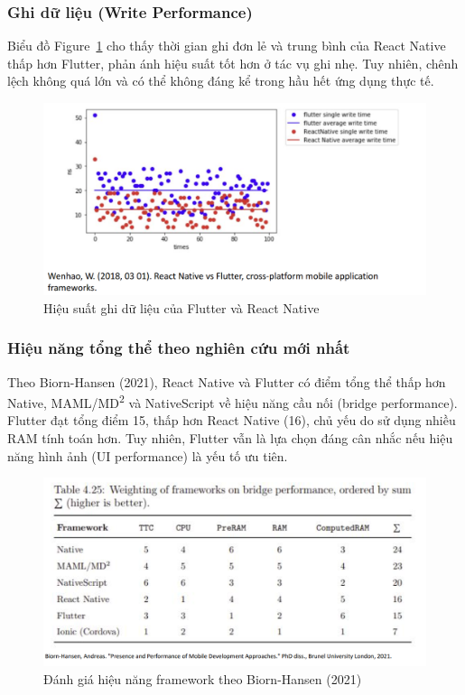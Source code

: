 \subsubsection{Ghi dữ liệu (Write Performance)}

  Biểu đồ Figure~\ref{fig:write} cho thấy thời gian ghi đơn lẻ và trung bình của React Native thấp hơn Flutter, phản ánh hiệu suất tốt hơn ở tác vụ ghi nhẹ. Tuy nhiên, chênh lệch không quá lớn và có thể không đáng kể trong hầu hết ứng dụng thực tế.

\begin{figure}[H]
    \centering
    \includegraphics[width=0.8\linewidth]{images/read_write.png}
    \caption{Hiệu suất ghi dữ liệu của Flutter và React Native \cite{maulana2023}}
    \label{fig:write}
\end{figure}

\subsubsection{Hiệu năng tổng thể theo nghiên cứu mới nhất}

  Theo Biorn-Hansen (2021), React Native và Flutter có điểm tổng thể thấp hơn Native, MAML/MD\textsuperscript{2} và NativeScript về hiệu năng cầu nối (bridge performance). Flutter đạt tổng điểm 15, thấp hơn React Native (16), chủ yếu do sử dụng nhiều RAM tính toán hơn. Tuy nhiên, Flutter vẫn là lựa chọn đáng cân nhắc nếu hiệu năng hình ảnh (UI performance) là yếu tố ưu tiên.

\begin{figure}[H]
    \centering
    \includegraphics[width=0.7\linewidth]{images/performance.png}
    \caption{Đánh giá hiệu năng framework theo Biorn-Hansen (2021)}
    \label{fig:overall}
\end{figure}


